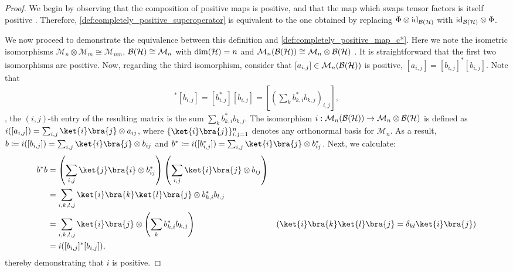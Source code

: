 \begin{proof}
  We begin by observing that the composition of positive maps is positive, and that the map which swaps tensor factors is itself positive \cite{watrous2018theory}. Therefore, \autoref{def:completely_positive_superoperator} is equivalent to the one obtained by replacing \( \Phi \otimes \mathrm{id}_{\mathcal{B}(\mathcal{H})} \) with \( \mathrm{id}_{\mathcal{B}(\mathcal{H})} \otimes \Phi \). 

  We now proceed to demonstrate the equivalence between this definition and \autoref{def:completely_positive_map_c*}. Here we note the isometric isomorphisms $\mathcal{M}_n \otimes \mathcal{M}_m \cong \mathcal{M}_{nm}$, $\mathcal{B}(\mathcal{H})\cong \mathcal{M}_{n}$ \cite{watrous2018theory} with $\text{dim}(\mathcal{H})=n$ and $\mathcal{M}_n(\mathcal{B}(\mathcal{H}))\cong \mathcal{M}_n \otimes \mathcal{B}(\mathcal{H})$ \cite[Corollary 8.1.3]{effrosOperatorSpaces2000}. It is straightforward that the first two isomorphisms are positive. Now, regarding the third isomorphism, consider that $[a_{i,j}] \in \mathcal{M}_n(\mathcal{B}(\mathcal{H}))$ is positive, \ie $[a_{i,j}] = [b_{i,j}]^* [b_{i,j}] $. Note that
  \begin{align*}
     [b_{i,j}]^* [b_{i,j}] = [b_{i,j}^*] [b_{i,j}] = \left[  \left(\sum_k b_{k,i}^* b_{k,j} \right)_{i,j} \right],
  \end{align*}
\ie, the $(i,j)$-th entry of the resulting matrix is the sum $\sum_k b_{k,i}^* b_{k,j}$.
The isomorphism $i:\mathcal{M}_n(\mathcal{B}(\mathcal{H})) \to \mathcal{M}_n \otimes \mathcal{B}(\mathcal{H})$ is defined as $i([a_{i,j}]) = \sum_{i,j}  \ket{i}\bra{j} \otimes a_{ij} $,
where $\{ \ket{i}\bra{j} \}_{i,j=1}^n  $ denotes any orthonormal basis for \( \mathcal{M}_n \).
As a result, $b \coloneqq i([b_{i,j}]) = \sum_{i,j}  \ket{i}\bra{j} \otimes b_{ij}$ and $b^* \coloneqq i([b_{i,j}^*]) = \sum_{i,j}  \ket{i}\bra{j} \otimes b_{ij}^*$.
Next, we calculate:
\begin{align*}
  b^*b &= \left( \sum_{i,j}  \ket{j}\bra{i} \otimes b_{ij}^* \right)  \left( \sum_{i,j}  \ket{i}\bra{j} \otimes b_{ij} \right) \\
  & = \sum_{i,k,l,j} \ket{i}\bra{k} \ket{l}\bra{j} \otimes  b_{k,i}^* b_{l,j} \\
  & = \sum_{i,k,l,j} \ket{i}\bra{j} \otimes \left(\sum_{k} b_{k,i}^* b_{k,j}\right)  & ( \ket{i}\bra{k} \ket{l}\bra{j} = \delta_{kl} \ket{i}\bra{j}) \\
  & = i([b_{i,j}]^* [b_{i,j}]),
\end{align*} 
thereby demonstrating that $i$ is positive.


\end{proof}
